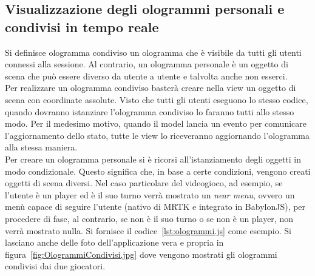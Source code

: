 \subsection{Visualizzazione degli ologrammi personali e condivisi in tempo reale}
Si definisce ologramma condiviso un ologramma che è visibile da tutti gli utenti connessi alla sessione. Al contrario, un ologramma personale è un oggetto di scena che può essere diverso
da utente a utente e talvolta anche non esserci.\\
Per realizzare un ologramma condiviso basterà creare nella view un oggetto di scena con coordinate assolute. Visto che tutti gli utenti eseguono lo stesso codice, quando
dovranno istanziare l'ologramma condiviso lo faranno tutti allo stesso modo. Per il medesimo motivo, quando il model lancia un evento per comunicare l'aggiornamento dello stato, tutte le 
view lo riceveranno aggiornando l'ologramma alla stessa maniera.\\
Per creare un ologramma personale si è ricorsi all'istanziamento degli oggetti in modo condizionale. Questo significa che, in base a certe condizioni, vengono creati oggetti di scena 
diversi. Nel caso particolare del videogioco, ad esempio, se l'utente è un player ed è il suo turno verrà mostrato un
\textit{near menu}, ovvero un menù capace di seguire l'utente (nativo di MRTK e integrato in BabylonJS), per procedere di fase, al contrario, se non è il suo turno o se non è un
player, non verrà mostrato nulla. Si fornisce il codice~\ref{lst:ologrammi.js} come esempio. Si lasciano anche delle foto dell'applicazione vera e propria in figura~\ref{fig:OlogrammiCondivisi.jpg}
dove vengono mostrati gli ologrammi condivisi dai due giocatori.
